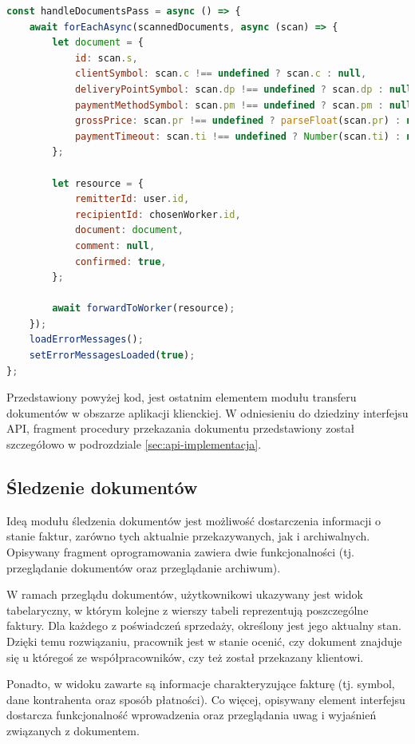 \begin{lstlisting}[label=lst:forward-worker-handle-pass,caption=Kod funkcji przekazania dokumentów, captionpos=b,basicstyle=\footnotesize\ttfamily,language=JavaScript]
const handleDocumentsPass = async () => {
	await forEachAsync(scannedDocuments, async (scan) => {
		let document = {
			id: scan.s,
			clientSymbol: scan.c !== undefined ? scan.c : null,
			deliveryPointSymbol: scan.dp !== undefined ? scan.dp : null,
			paymentMethodSymbol: scan.pm !== undefined ? scan.pm : null,
			grossPrice: scan.pr !== undefined ? parseFloat(scan.pr) : null,
			paymentTimeout: scan.ti !== undefined ? Number(scan.ti) : null,
		};

		let resource = {
			remitterId: user.id,
			recipientId: chosenWorker.id,
			document: document,
			comment: null,
			confirmed: true,
		};

		await forwardToWorker(resource);
	});
	loadErrorMessages();
	setErrorMessagesLoaded(true);
};
\end{lstlisting}

Przedstawiony powyżej kod, jest ostatnim elementem modułu transferu dokumentów w obszarze aplikacji klienckiej. W odniesieniu do dziedziny interfejsu API, fragment procedury przekazania dokumentu przedstawiony został szczegółowo w podrozdziale \ref{sec:api-implementacja}.

\subsection{Śledzenie dokumentów}
Ideą modułu śledzenia dokumentów jest możliwość dostarczenia informacji o stanie faktur, zarówno tych aktualnie przekazywanych, jak i archiwalnych. Opisywany fragment oprogramowania zawiera dwie funkcjonalności (tj. przeglądanie dokumentów oraz przeglądanie archiwum).

W ramach przeglądu dokumentów, użytkownikowi ukazywany jest widok tabelaryczny, w którym kolejne z wierszy tabeli reprezentują poszczególne faktury. Dla każdego z poświadczeń sprzedaży, określony jest jego aktualny stan. Dzięki temu rozwiązaniu, pracownik jest w stanie ocenić, czy dokument znajduje się u któregoś ze współpracowników, czy też został przekazany klientowi.

Ponadto, w widoku zawarte są informacje charakteryzujące fakturę (tj. symbol, dane kontrahenta oraz sposób płatności). Co więcej, opisywany element interfejsu dostarcza funkcjonalność wprowadzenia oraz przeglądania uwag i wyjaśnień związanych z dokumentem.

